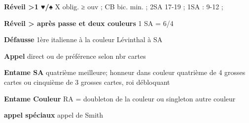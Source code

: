 \documentclass[twoside,a5paper]{article}
\newcommand{\g}[1]{\textbf{#1}}
\begin{document}
{\begin{multicols}{2}
	 
	  \g{Réveil >1 ♥/♠} \newline
	 X oblig. ≥ ouv  ; CB bic. min. ; 2SA 17-19 ; 1SA : 9-12   ; \newline


	\g{Réveil > après passe et deux couleurs}
	 1 SA = 6/4	
	 
	
	  						 
	 
	 \vfill\columnbreak%
	 
	  \g{Défausse} \newline
	  1ère italienne à la couleur 
	  Lévinthal à SA\newline
	  
	  
	  \g{Appel} \newline
	 direct ou de préférence selon nbr cartes\newline
	 
	 
	 
	 \g{Entame SA} \newline
	quatrième meilleure; honneur dans couleur quatrième de 4 grosses cartes ou cinquième de 3 grosses cartes, roi débloquant\newline


	\g{Entame Couleur} \newline
	RA = doubleton de la couleur ou singleton autre couleur\newline


	\g{appel spéciaux} \newline
	appel de Smith

	
	\end{multicols}
}
\end{document}
